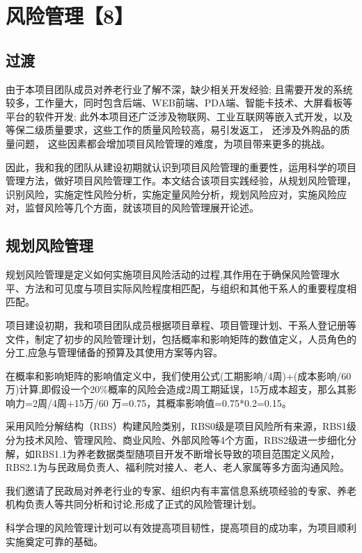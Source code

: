 \documentclass[UTF8]{../computerUniverse}
\begin{document}
\chapter{风险管理【8】}

\section{过渡}

由于本项目团队成员对养老行业了解不深，缺少相关开发经验;
且需要开发的系统较多，工作量大，同时包含后端、WEB前端、PDA端、智能卡技术、大屏看板等平台的软件开发;
此外本项目还广泛涉及物联网、工业互联网等嵌入式开发，以及等保二级质量要求，这些工作的质量风险较高，易引发返工，
还涉及外购品的质量问题，
这些因素都会增加项目风险管理的难度，为项目带来更多的挑战。

因此，我和我的团队从建设初期就认识到项目风险管理的重要性，运用科学的项目管理方法，做好项目风险管理工作。本文结合该项目实践经验，从规划风险管理，识别风险，实施定性风险分析，实施定量风险分析，规划风险应对，实施风险应对，监督风险等几个方面，就该项目的风险管理展开论述。

\section{规划风险管理}

规划风险管理是定义如何实施项目风险活动的过程,其作用在于确保风险管理水平、方法和可见度与项目实际风险程度相匹配，与组织和其他干系人的重要程度相匹配。

项目建设初期，我和项目团队成员根据项目章程、项目管理计划、干系人登记册等文件，制定了初步的风险管理计划，包括概率和影响矩阵的数值定义，人员角色的分工,应急与管理储备的预算及其使用方案等内容。

在概率和影响矩阵的影响值定义中，我们使用公式(工期影响/4周)+(成本影响/60万)计算,即假设一个20\%概率的风险会造成2周工期延误，15万成本超支，那么其影响力=2周/4周+15万/60 万=0.75，其概率影响值=0.75*0.2=0.15。

采用风险分解结构（RBS）构建风险类别，RBS0级是项目风险所有来源，RBS1级分为技术风险、管理风险、商业风险、外部风险等4个方面，RBS2级进一步细化分解，如RBS1.1为养老数据类型随项目开发不断增长导致的项目范围定义风险，RBS2.1为与民政局负责人、福利院对接人、老人、老人家属等多方面沟通风险。

我们邀请了民政局对养老行业的专家、组织内有丰富信息系统项经验的专家、养老机构负责人等共同分析和讨论,形成了正式的风险管理计划。

科学合理的风险管理计划可以有效提高项目韧性，提高项目的成功率，为项目顺利实施奠定可靠的基础。
\end{document}
